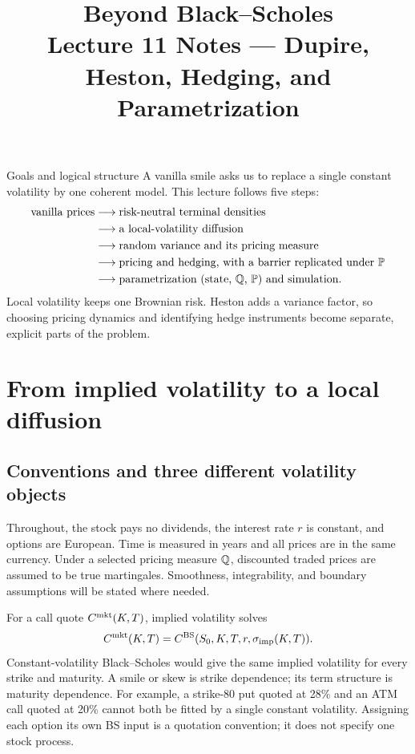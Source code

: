 \documentclass[10pt]{article}
\title{\textbf{Beyond Black--Scholes}\\
\large Lecture 11 Notes --- Dupire, Heston, Hedging, and Parametrization}
\author{}\date{}
\theoremstyle{definition}\newtheorem{definition}{Definition}[section]
\begin{document}
\maketitle\vspace{-1.4em}

\begin{keyidea}{Goals and logical structure}
A vanilla smile asks us to replace a single constant volatility by one
coherent model. This lecture follows five steps:
\[
\begin{aligned}
\text{vanilla prices}&\longrightarrow\text{risk-neutral terminal densities}\\
&\longrightarrow\text{a local-volatility diffusion}\\
&\longrightarrow\text{random variance and its pricing measure}\\
&\longrightarrow\text{pricing and hedging, with a barrier replicated under }\mathbb P\\
&\longrightarrow\text{parametrization (state, }\mathbb Q\text{, }\mathbb P\text{) and simulation}.
\end{aligned}
\]
Local volatility keeps one Brownian risk. Heston adds a variance factor,
so choosing pricing dynamics and identifying hedge instruments become
separate, explicit parts of the problem.
\end{keyidea}

\section{From implied volatility to a local diffusion}
\subsection{Conventions and three different volatility objects}
Throughout, the stock pays no dividends, the interest rate \(r\) is
constant, and options are European. Time is measured in years and all
prices are in the same currency. Under a selected pricing measure \(\mathbb Q\),
discounted traded prices are assumed to be true martingales. Smoothness,
integrability, and boundary assumptions will be stated where needed.

For a call quote \(C^{\rm mkt}(K,T)\), implied volatility solves
\[
C^{\rm mkt}(K,T)=C^{\rm BS}(S_0,K,T,r,\sigma_{\rm imp}(K,T)).
\]
Constant-volatility Black--Scholes would give the same implied volatility
for every strike and maturity. A smile or skew is strike dependence; its
term structure is maturity dependence. For example, a strike-80 put quoted
at 28\% and an ATM call quoted at 20\% cannot both be fitted by a single
constant volatility. Assigning each option its own BS input is a quotation
convention; it does not specify one stock process.
\end{document}
